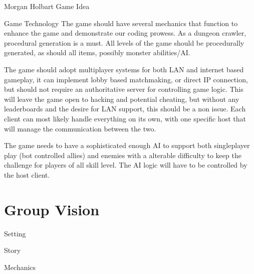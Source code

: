 \documentclass[12pt]{report}
\begin{document}
\begin{section}{Morgan Holbart Game Idea}
\begin{subsection}{Game Technology}
The game should have several mechanics that function to enhance the game and demonstrate our coding prowess. As
a dungeon crawler, procedural generation is a must. All levels of the game should be procedurally generated, as
should all items, possibly monster abilities/AI.

The game should adopt multiplayer systems for both LAN and internet based gameplay, it can implement lobby based
matchmaking, or direct IP connection, but should not require an authoritative server for controlling game logic. 
This will leave the game open to hacking and potential cheating, but without any leaderboards and the desire for
LAN support, this should be a non issue. Each client can most likely handle everything on its own, with one specific
host that will manage the communication between the two.

The game needs to have a sophisticated enough AI to support both singleplayer play (bot controlled allies) and enemies
with a alterable difficulty to keep the challenge for players of all skill level. The AI logic will have to be 
controlled by the host client.
\end{subsection}
\end{section}

\chapter{Group Vision}


\begin{section}{Setting}
\end{section}

\begin{section}{Story}
\end{section}

\begin{section}{Mechanics}
\end{section}
\end{document}
